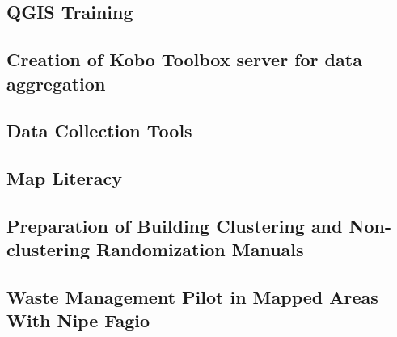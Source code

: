 \documentclass[a4paper,12pt,twoside]{article}
\begin{document}
\begin{multicols}{2}
\lipsum[0-5]
\end{multicols}

\subsection{QGIS Training}

\begin{multicols}{2}
\lipsum[0-5]
\end{multicols}

\subsection{Creation of Kobo Toolbox  server for data aggregation}

\begin{multicols}{2}
\lipsum[0-5]
\end{multicols}
	
\subsection{Data Collection Tools}

\begin{multicols}{2}
\lipsum[0-5]
\end{multicols}

\subsection{Map Literacy}

\begin{multicols}{2}
\lipsum[0-5]
\end{multicols}

\subsection{Preparation of Building Clustering and Non-clustering Randomization Manuals}

\begin{multicols}{2}
\lipsum[0-5]
\end{multicols}
\subsection{Waste Management Pilot in Mapped Areas With Nipe Fagio}

\begin{multicols}{2}
\lipsum[0-5]
\end{multicols}
\end{document}
